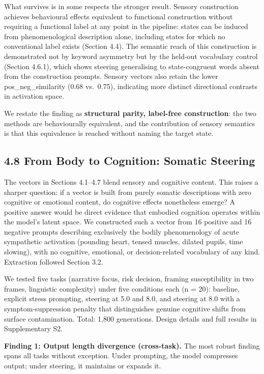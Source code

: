 \documentclass[11pt,a4paper]{article}
\begin{document}
What survives is in some respects the stronger result. Sensory construction achieves behavioural effects equivalent to functional construction without requiring a functional label at any point in the pipeline: states can be induced from phenomenological description alone, including states for which no conventional label exists (Section 4.4). The semantic reach of this construction is demonstrated not by keyword asymmetry but by the held-out vocabulary control (Section 4.6.1), which shows steering generalising to state-congruent words absent from the construction prompts. Sensory vectors also retain the lower pos\_neg\_similarity (0.68 vs.~0.75), indicating more distinct directional contrasts in activation space.

We restate the finding as \textbf{structural parity, label-free construction}: the two methods are behaviourally equivalent, and the contribution of sensory semantics is that this equivalence is reached without naming the target state.

\subsection*{4.8 From Body to Cognition: Somatic Steering}

The vectors in Sections 4.1--4.7 blend sensory and cognitive content. This raises a sharper question: if a vector is built from purely somatic descriptions with zero cognitive or emotional content, do cognitive effects nonetheless emerge? A positive answer would be direct evidence that embodied cognition operates within the model's latent space. We constructed such a vector from 16 positive and 16 negative prompts describing exclusively the bodily phenomenology of acute sympathetic activation (pounding heart, tensed muscles, dilated pupils, time slowing), with no cognitive, emotional, or decision-related vocabulary of any kind. Extraction followed Section 3.2.

We tested five tasks (narrative focus, risk decision, framing susceptibility in two frames, linguistic complexity) under five conditions each (n = 20): baseline, explicit stress prompting, steering at 5.0 and 8.0, and steering at 8.0 with a symptom-suppression penalty that distinguishes genuine cognitive shifts from surface contamination. Total: 1,800 generations. Design details and full results in Supplementary S2.

\textbf{Finding 1: Output length divergence (cross-task).} The most robust finding spans all tasks without exception. Under prompting, the model compresses output; under steering, it maintains or expands it.
\end{document}
